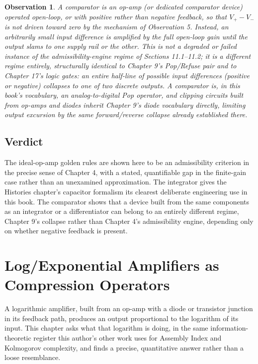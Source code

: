 \documentclass[12pt]{article}
\newtheorem{observation}{Observation}
\begin{document}
\begin{observation}
A comparator is an op-amp (or dedicated comparator device) operated open-loop, or with positive rather than negative feedback, so that $V_+ - V_-$ is not driven toward zero by the mechanism of Observation 5. Instead, an arbitrarily small input difference is amplified by the full open-loop gain until the output slams to one supply rail or the other. This is not a degraded or failed instance of the admissibility-engine regime of Sections 11.1--11.2; it is a different regime entirely, structurally identical to Chapter 9's Pop/Refuse pair and to Chapter 17's logic gates: an entire half-line of possible input differences (positive or negative) collapses to one of two discrete outputs. A comparator is, in this book's vocabulary, an analog-to-digital Pop operator, and clipping circuits built from op-amps and diodes inherit Chapter 9's diode vocabulary directly, limiting output excursion by the same forward/reverse collapse already established there.
\end{observation}

\subsection{Verdict}

The ideal-op-amp golden rules are shown here to be an admissibility criterion in the precise sense of Chapter 4, with a stated, quantifiable gap in the finite-gain case rather than an unexamined approximation. The integrator gives the Histories chapter's capacitor formalism its clearest deliberate engineering use in this book. The comparator shows that a device built from the same components as an integrator or a differentiator can belong to an entirely different regime, Chapter 9's collapse rather than Chapter 4's admissibility engine, depending only on whether negative feedback is present.

\section{Log/Exponential Amplifiers as Compression Operators}

A logarithmic amplifier, built from an op-amp with a diode or transistor junction in its feedback path, produces an output proportional to the logarithm of its input. This chapter asks what that logarithm is doing, in the same information-theoretic register this author's other work uses for Assembly Index and Kolmogorov complexity, and finds a precise, quantitative answer rather than a loose resemblance.
\end{document}

